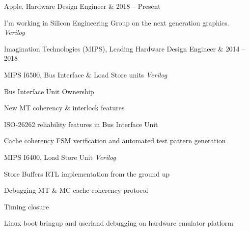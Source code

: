 \documentclass[a4paper]{scrartcl}
\begin{document}
\begin{list1}

\item \begin{tabular1bold} Apple, Hardware Design Engineer & 2018 -- Present \end{tabular1bold}

  \begin{list2}

  \item I'm working in Silicon Engineering Group on the next generation graphics. \hfill \emph{Verilog}
    
  \end{list2}

\vspace{10pt}

\item \begin{tabular1bold} Imagination Technologies (MIPS), Leading Hardware Design Engineer & 2014 -- 2018 \end{tabular1bold}

  \begin{list2}

  \item MIPS I6500, Bus Interface \& Load Store units \hfill \emph{Verilog}
  
    \begin{list3}
    \item Bus Interface Unit Ownership
    \item New MT coherency \& interlock features
    \item ISO-26262 reliability features in Bus Interface Unit 
    \item Cache coherency FSM verification and automated test pattern generation
    \end{list3}
  
  \end{list2}

  \begin{list2}

  \item MIPS I6400, Load Store Unit \hfill \emph{Verilog}
  
    \begin{list3}
    \item Store Buffers RTL implementation from the ground up
    \item Debugging MT \& MC cache coherency protocol
    \item Timing closure
    \item Linux boot bringup and userland debugging on hardware emulator platform
    \end{list3}
  

\end{list2}
\end{list1}
\end{document}
